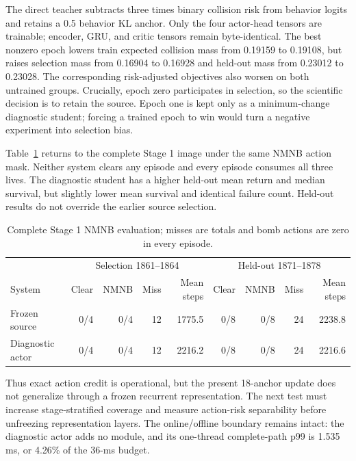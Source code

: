 \documentclass[10pt]{article}
\begin{document}
The direct teacher subtracts three times binary collision risk from behavior
logits and retains a 0.5 behavior KL anchor.  Only the four actor-head tensors
are trainable; encoder, GRU, and critic tensors remain byte-identical.  The best
nonzero epoch lowers train expected collision mass from 0.19159 to 0.19108, but
raises selection mass from 0.16904 to 0.16928 and held-out mass from 0.23012 to
0.23028.  The corresponding risk-adjusted objectives also worsen on both
untrained groups.  Crucially, epoch zero participates in selection, so the
scientific decision is to retain the source.  Epoch one is kept only as a
minimum-change diagnostic student; forcing a trained epoch to win would turn a
negative experiment into selection bias.

Table~\ref{tab:nmnb-live} returns to the complete Stage 1 image under the same
NMNB action mask.  Neither system clears any episode and every episode consumes
all three lives.  The diagnostic student has a higher held-out mean return and
median survival, but slightly lower mean survival and identical failure count.
Held-out results do not override the earlier source selection.

\begin{table}[ht]
  \centering
  \caption{Complete Stage 1 NMNB evaluation; misses are totals and bomb actions
  are zero in every episode.}
  \label{tab:nmnb-live}
  \begin{tabular}{lrrrrrrrr}
    \toprule
    & \multicolumn{4}{c}{Selection 1861--1864} &
      \multicolumn{4}{c}{Held-out 1871--1878} \\
    System & Clear & NMNB & Miss & Mean steps & Clear & NMNB & Miss & Mean steps \\
    \midrule
    Frozen source & 0/4 & 0/4 & 12 & 1775.5 & 0/8 & 0/8 & 24 & 2238.8 \\
    Diagnostic actor & 0/4 & 0/4 & 12 & 2216.2 & 0/8 & 0/8 & 24 & 2216.6 \\
    \bottomrule
  \end{tabular}
\end{table}

Thus exact action credit is operational, but the present 18-anchor update does
not generalize through a frozen recurrent representation.  The next test must
increase stage-stratified coverage and measure action-risk separability before
unfreezing representation layers.  The online/offline boundary remains intact:
the diagnostic actor adds no module, and its one-thread complete-path p99 is
1.535 ms, or 4.26\% of the 36-ms budget.
\end{document}

